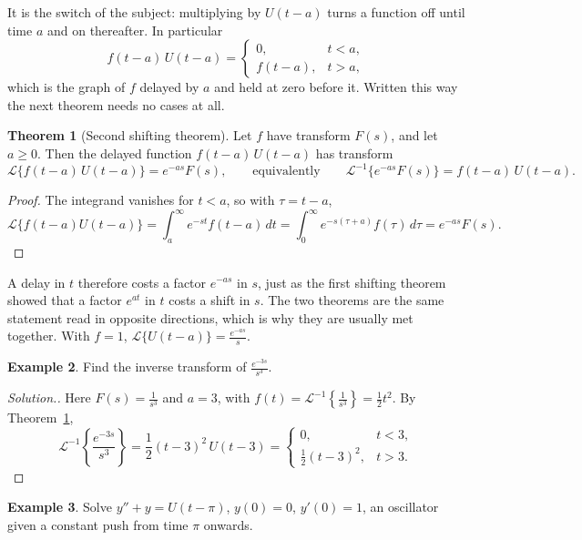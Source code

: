 \documentclass[11pt,a4paper]{article}
\theoremstyle{definition}
\newtheorem{thm}{Theorem}[subsection]
\newtheorem{exa}[thm]{Example}
\newenvironment{solution}
  {\renewcommand{\qedsymbol}{}\begin{proof}[\textit{Solution}.]}
  {\end{proof}}
\begin{document}
It is the switch of the subject: multiplying by $U(t-a)$ turns a function off
until time $a$ and on thereafter. In particular
\[f(t-a)\,U(t-a) =
\begin{cases}
0, & t<a,\\
f(t-a), & t>a ,
\end{cases}
\]
which is the graph of $f$ delayed by $a$ and held at zero before it. Written
this way the next theorem needs no cases at all.

\begin{thm}[Second shifting theorem]
\label{thm:tshift}
Let $f$ have transform $F(s)$, and let $a\geq 0$. Then the delayed function
$f(t-a)\,U(t-a)$ has transform
\[\mathcal{L}\{f(t-a)\,U(t-a)\} = e^{-as}F(s),\qquad\text{equivalently}\qquad
\mathcal{L}^{-1}\{e^{-as}F(s)\} = f(t-a)\,U(t-a) .\]
\end{thm}

\begin{proof}
The integrand vanishes for $t<a$, so with $\tau = t - a$,
\[\mathcal{L}\{f(t-a)U(t-a)\} = \int_a^\infty e^{-st}f(t - a)\,dt = \int_0^\infty
e^{-s(\tau + a)}f(\tau)\,d\tau = e^{-as}F(s) .\]
\end{proof}

A delay in $t$ therefore costs a factor $e^{-as}$ in $s$, just as the first
shifting theorem showed that a factor $e^{at}$ in $t$ costs a shift in $s$. The
two theorems are the same statement read in opposite directions, which is why
they are usually met together. With $f = 1$, $\mathcal{L}\{U(t - a)\} =
\frac{e^{-as}}{s}$.

\begin{exa}
\label{ex:tshiftinverse}
Find the inverse transform of $\frac{e^{-3s}}{s^3}$.
\end{exa}

\begin{solution}
Here $F(s) = \frac{1}{s^3}$ and $a = 3$, with $f(t) = \mathcal{L}^{-1}\left\{
\frac{1}{s^3}\right\} = \frac{1}{2}t^2$. By Theorem~\ref{thm:tshift},
\[\mathcal{L}^{-1}\left\{ \frac{e^{-3s}}{s^3}\right\} = \frac{1}{2}(t-3)^2\,U(t-3)
=
\begin{cases}
0, & t<3,\\
\frac{1}{2}(t -3)^2, & t>3.
\end{cases}\]
\end{solution}

\begin{exa}
\label{ex:switchedforce}
Solve $y'' + y = U(t - \pi)$, $y(0) = 0$, $y'(0) = 1$, an oscillator given a
constant push from time $\pi$ onwards.
\end{exa}
\end{document}
